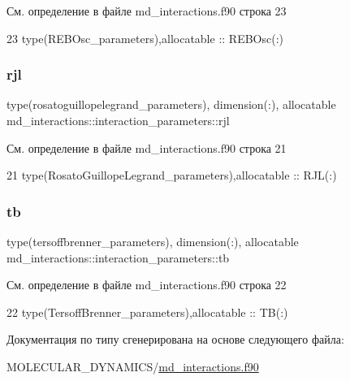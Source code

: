 См. определение в файле md\+\_\+interactions.\+f90 строка 23


\begin{DoxyCode}
23     \textcolor{keywordtype}{type}(REBOsc\_parameters),allocatable                 :: REBOsc(:)
\end{DoxyCode}
\mbox{\label{structmd__interactions_1_1interaction__parameters_ae23b19b674151370a0cb9b6b24b8ea86}} 
\subsubsection{\texorpdfstring{rjl}{rjl}}
{\footnotesize\ttfamily type(rosatoguillopelegrand\+\_\+parameters), dimension(\+:), allocatable md\+\_\+interactions\+::interaction\+\_\+parameters\+::rjl}



См. определение в файле md\+\_\+interactions.\+f90 строка 21


\begin{DoxyCode}
21     \textcolor{keywordtype}{type}(RosatoGuillopeLegrand\_parameters),allocatable  :: RJL(:)
\end{DoxyCode}
\mbox{\label{structmd__interactions_1_1interaction__parameters_acb1a5443eba1a0c63403bc9e8dc73cfd}} 
\subsubsection{\texorpdfstring{tb}{tb}}
{\footnotesize\ttfamily type(tersoffbrenner\+\_\+parameters), dimension(\+:), allocatable md\+\_\+interactions\+::interaction\+\_\+parameters\+::tb}



См. определение в файле md\+\_\+interactions.\+f90 строка 22


\begin{DoxyCode}
22     \textcolor{keywordtype}{type}(TersoffBrenner\_parameters),allocatable         :: TB(:)
\end{DoxyCode}


Документация по типу сгенерирована на основе следующего файла\+:\begin{DoxyCompactItemize}
\item 
M\+O\+L\+E\+C\+U\+L\+A\+R\+\_\+\+D\+Y\+N\+A\+M\+I\+C\+S/\mbox{\hyperlink{md__interactions_8f90}{md\+\_\+interactions.\+f90}}\end{DoxyCompactItemize}
